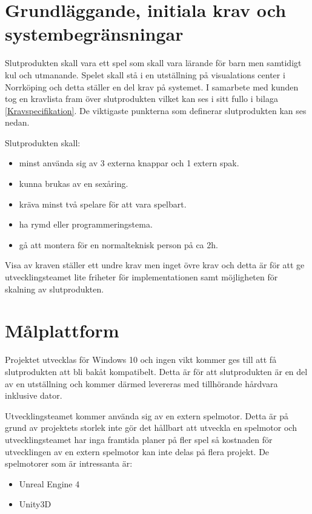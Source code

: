 \documentclass[a4paper,12pt,oneside,final]{extbook}
\begin{document}
\section{Grundläggande, initiala krav och systembegränsningar}
Slutprodukten skall vara ett spel som skall vara lärande för barn men samtidigt kul och utmanande. Spelet skall stå i en utställning på visualations center i Norrköping och detta ställer en del krav på systemet. I samarbete med kunden tog en kravlista fram över slutprodukten vilket kan ses i sitt fullo i bilaga \ref{Kravspecifikation}. De viktigaste punkterna som definerar slutprodukten kan ses nedan.

Slutprodukten skall:
\begin{itemize}
	\item minst använda sig av 3 externa knappar och 1 extern spak.
	\item kunna brukas av en sexåring.
	\item kräva minst två spelare för att vara spelbart.
	\item ha rymd eller programmeringstema.
	\item gå att montera för en normalteknisk person på ca 2h.
\end{itemize}

Visa av kraven ställer ett undre krav men inget övre krav och detta är för att ge utvecklingsteamet lite friheter för implementationen samt möjligheten för skalning av slutprodukten.

\section{Målplattform}

Projektet utvecklas för Windows 10 och ingen vikt kommer ges till att få slutprodukten att bli bakåt kompatibelt. Detta är för att slutprodukten är en del av en utställning och kommer därmed levereras med tillhörande hårdvara inklusive dator. 

Utvecklingsteamet kommer använda sig av en extern spelmotor. Detta är på grund av projektets storlek inte gör det hållbart att utveckla en spelmotor och utvecklingsteamet har inga framtida planer på fler spel så kostnaden för utvecklingen av en extern spelmotor kan inte delas på flera projekt. De spelmotorer som är intressanta är:
  
\begin{itemize}
	\item Unreal Engine 4
	\item Unity3D

\end{itemize}
\end{document}
